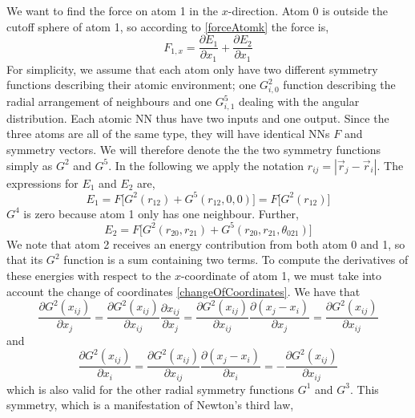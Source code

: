 \documentclass[twoside,english]{uiofysmaster}
\begin{document}
We want to find the force on atom 1 in the $x$-direction. Atom 0 is outside the cutoff sphere of atom 1, 
so according to \eqref{forceAtomk} the force is,
\begin{equation}
 F_{1,x} = \frac{\partial E_1}{\partial x_1} + \frac{\partial E_2}{\partial x_1}
 \label{forceOnAtom1}
\end{equation}
For simplicity, we assume that each atom only have two different symmetry functions describing their atomic environment;
one $G_{i,0}^2$ function describing the radial arrangement of neighbours and one $G_{i,1}^5$ dealing with the angular distribution.
Each atomic NN thus have two inputs and one output. 
Since the three atoms are all of the same type, they will have identical NNs $F$ and symmetry vectors. We will therefore 
denote the the two symmetry functions simply as $G^2$ and $G^5$. In the following we apply the notation
$r_{ij} = |\vec{r}_j - \vec{r}_i|$. 
The expressions for $E_1$ and $E_2$ are,
\begin{equation}
 E_1 = F\bigr[G^2(r_{12}) + G^5(r_{12},0,0)\bigr] = F\bigr[G^2(r_{12})\bigr]
 \label{energyAtom1}
\end{equation}
$G^4$ is zero because atom 1 only has one neighbour. Further, 
\begin{equation}
 E_2 = F\bigr[G^2(r_{20}, r_{21}) + G^5(r_{20},r_{21},\theta_{021})\bigr]
 \label{energyAtom2}
\end{equation}
We note that atom 2 receives an energy contribution from both atom 0 and 1, so that 
its $G^2$ function is a sum containing two terms. 
To compute the derivatives of these energies with respect to the $x$-coordinate of atom 1, we
must take into account the change of coordinates \eqref{changeOfCoordinates}. We have that
\begin{equation}
 \frac{\partial G^2(x_{ij})}{\partial x_j} = \frac{\partial G^2(x_{ij})}{\partial x_{ij}}\frac{\partial x_{ij}}{\partial x_j}
 = \frac{\partial G^2(x_{ij})}{\partial x_{ij}}\frac{\partial (x_j-x_i)}{\partial x_j} = 
 \frac{\partial G^2(x_{ij})}{\partial x_{ij}}
 \label{changeOfCoordsSymmetry1}
\end{equation}
and
\begin{equation}
 \frac{\partial G^2(x_{ij})}{\partial x_i} = \frac{\partial G^2(x_{ij})}{\partial x_{ij}}\frac{\partial (x_j-x_i)}{\partial x_i} =
 -\frac{\partial G^2(x_{ij})}{\partial x_{ij}}
 \label{changeOfCoordsSymmetry2}
\end{equation}
which is also valid for the other radial symmetry functions $G^1$ and $G^3$.   
This symmetry, which is a manifestation of Newton's third law,
\end{document}
